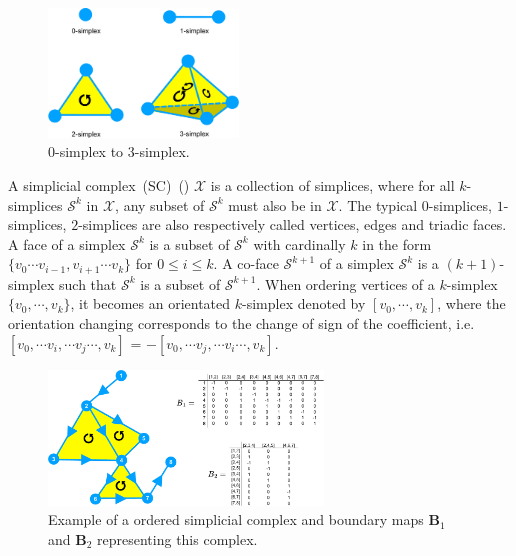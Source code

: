 \begin{figure}[!h]
    \centering
    \includegraphics[width=0.45\textwidth]{Simplex/fig}
    \vspace{0.1cm}
    \caption[0-simplex to 3-simplex.]{0-simplex to 3-simplex.}
    \label{fig:simplex}
\end{figure}

A simplicial complex~(SC)~() $\mathcal{X}$ is a collection of simplices, where for all $k$-simplices $\mathcal{S}^k$ in $\mathcal{X}$, any subset of $\mathcal{S}^k$ must also be in $\mathcal{X}$. The typical $0$-simplices, $1$-simplices, $2$-simplices are also respectively called vertices, edges and triadic faces. A face of a simplex $\mathcal{S}^k$ is a subset of $\mathcal{S}^k$  with cardinally $k$ in the form $\{v_0 \cdots v_{i-1}, v_{i+1}\cdots v_k\}$ for $0 \leq i \leq k$. A co-face $\mathcal{S}^{k+1}$ of a simplex $\mathcal{S}^k$ is a $(k + 1)$-simplex such that $\mathcal{S}^k$ is a subset of $\mathcal{S}^{k+1}$.  When ordering vertices of a $k$-simplex $\{{v}_0,\cdots,{v}_k \}$, it becomes an orientated $k$-simplex denoted by $[{v}_0,\cdots,{v}_k ]$, where the orientation changing corresponds to the change of sign of the coefficient, i.e. $[{v}_0,\cdots {v}_i, \cdots {v}_j\cdots,{v}_k ]$ = $-[{v}_0,\cdots {v}_j, \cdots {v}_i\cdots,{v}_k ]$.

\begin{figure}[!h]
    \centering
    \includegraphics[width=0.65\textwidth]{Simplicial_Complex/fig}
    \vspace{0.1cm}
    \caption[A simplicial complex example.]{Example of a ordered simplicial complex and boundary maps $\mathbf{B}_1$ and $\mathbf{B}_2$ representing this
complex.}
    \label{fig:sc}
\end{figure}


